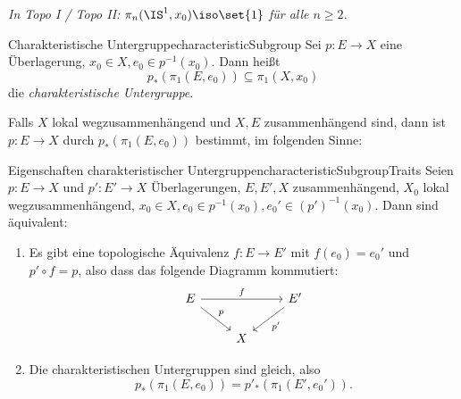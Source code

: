 \documentclass[language=ngerman]{TemplateLecture} %
\begin{document}
\emph{In Topo I / Topo II: $\pi_n(\IS^1, x_0) \iso \set{1}$ für alle $n \geq 2$.}

\begin{defi}{Charakteristische Untergruppe}{characteristicSubgroup}
    Sei $p: E \to X$ eine Überlagerung, $x_0 \in X, e_0 \in p^{-1}(x_0)$. Dann heißt
    \begin{equation*}
        p_*(\pi_1(E, e_0)) \subseteq \pi_1(X,x_0)
    \end{equation*}
    die \emph{charakteristische Untergruppe}.
\end{defi}
Falls $X$ lokal wegzusammenhängend und $X, E$ zusammenhängend sind, dann ist $p: E \to X$ durch $p_*(\pi_1(E, e_0))$ bestimmt, im folgenden Sinne:

\begin{thm}{Eigenschaften charakteristischer Untergruppen}{characteristicSubgroupTraits}
    Seien $p: E \to X$ und $p': E' \to X$ Überlagerungen, $E, E', X$ zusammenhängend, $X_0$ lokal wegzusammenhängend, $x_0 \in X, e_0 \in p^{-1}(x_0), e_0' \in (p')^{-1}(x_0)$. Dann sind äquivalent:
    \begin{enumerate}[$(i)$]
        \item Es gibt eine topologische Äquivalenz $f: E \to E'$ mit $f(e_0) = e_0'$ und $p' \circ f = p$, also dass das folgende Diagramm kommutiert:
        \begin{equation*}
            \begin{tikzcd}
                E \arrow[rr, "f"] \arrow[dr, "p"] & & E' \arrow[dl, "p'"] \\ & X
            \end{tikzcd}
        \end{equation*}
        \item Die charakteristischen Untergruppen sind gleich, also 
        \begin{equation*}
            p_*(\pi_1(E, e_0)) = p'_*(\pi_1(E', e_0')).
        \end{equation*}
    \end{enumerate}
\end{thm}
\end{document}
